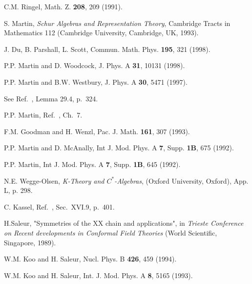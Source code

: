 \documentclass[twocolumn,floats,pra]{revtex4}
\begin{document}
\begin{references}
 C.M. Ringel, Math. Z. {\bf 208}, 209 (1991).

 S. Martin, {\it Schur Algebras and
Representation Theory}, Cambridge Tracts in Mathematics 112
(Cambridge University, Cambridge, UK, 1993).


 J. Du, B. Parshall, L. Scott, Commun. Math. Phys.
{\bf 195}, 321 (1998).

 P.P. Martin and D. Woodcock, J. Phys. A {\bf
31}, 10131 (1998).

 P.P. Martin and B.W. Westbury, J. Phys. A {\bf
30}, 5471 (1997).

 See Ref.\ \cite{anf}, Lemma 29.4, p.\ 324.

 P.P. Martin, Ref.\ \cite{martin}, Ch.\ 7.

 F.M. Goodman and H. Wenzl, Pac. J. Math. {\bf 161}, 307
(1993).

 P.P. Martin and D. McAnally, Int J. Mod. Phys. A
{\bf 7}, Supp. {\bf 1B}, 675 (1992).

 P.P. Martin, Int J. Mod. Phys. A {\bf 7}, Supp.
{\bf 1B}, 645 (1992).


 N.E. Wegge-Olsen, {\it K-Theory and $C^*$-Algebras},
(Oxford University, Oxford), App. L, p. 298.

 C. Kassel, Ref.\ \cite{kass}, Sec.\ XVI.9, p.\ 401.

 H.Saleur, "Symmetries of the XX chain and applications",
in {\it Trieste Conference on Recent developments in Conformal
Field Theories} (World Scientific, Singapore, 1989).


 W.M. Koo and H. Saleur, Nucl. Phys. B {\bf 426}, 459 (1994).

 W.M. Koo and H. Saleur, Int. J. Mod. Phys. A {\bf
8}, 5165 (1993).

\end{references}
\end{document}
